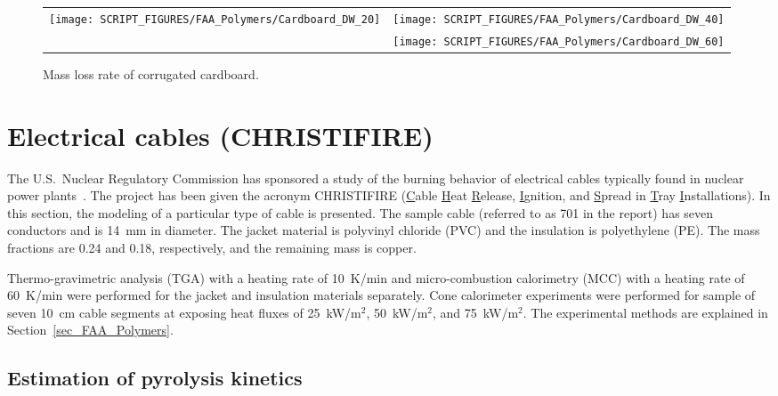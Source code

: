 \begin{figure}[h!]
\begin{tabular*}{\textwidth}{l@{\extracolsep{\fill}}r}
\texttt{[image: SCRIPT\_FIGURES/FAA\_Polymers/Cardboard\_DW\_20]} &
\texttt{[image: SCRIPT\_FIGURES/FAA\_Polymers/Cardboard\_DW\_40]} \\
 & \texttt{[image: SCRIPT\_FIGURES/FAA\_Polymers/Cardboard\_DW\_60]}
\end{tabular*}
\caption[Mass loss rate of corrugated cardboard]{Mass loss rate of corrugated cardboard.}
\label{MLR_Cardboard}
\end{figure}





\clearpage


\section{Electrical cables (CHRISTIFIRE)}

The U.S.~Nuclear Regulatory Commission has sponsored a study of the burning behavior of electrical cables typically found in nuclear power plants~\cite{CHRISTIFIRE}. The project has been given the acronym CHRISTIFIRE (\underline{C}able \underline{H}eat \underline{R}elease, \underline{I}gnition, and \underline{S}pread in \underline{T}ray \underline{I}nstallations). In this section, the modeling of a particular type of cable is presented. The sample cable (referred to as 701 in the report) has seven conductors and is 14~mm in diameter. The jacket material is polyvinyl chloride (PVC) and the insulation is polyethylene (PE). The mass fractions are 0.24 and 0.18, respectively, and the remaining mass is copper.

Thermo-gravimetric analysis (TGA) with a heating rate of 10~K/min and micro-combustion calorimetry (MCC) with a heating rate of 60~K/min were performed for the jacket and insulation materials separately. Cone calorimeter experiments were performed for sample of seven 10~cm cable segments at exposing heat fluxes of 25~kW/m$^2$, 50~kW/m$^2$, and 75~kW/m$^2$. The experimental methods are explained in Section~\ref{sec_FAA_Polymers}.

\subsection{Estimation of pyrolysis kinetics}

